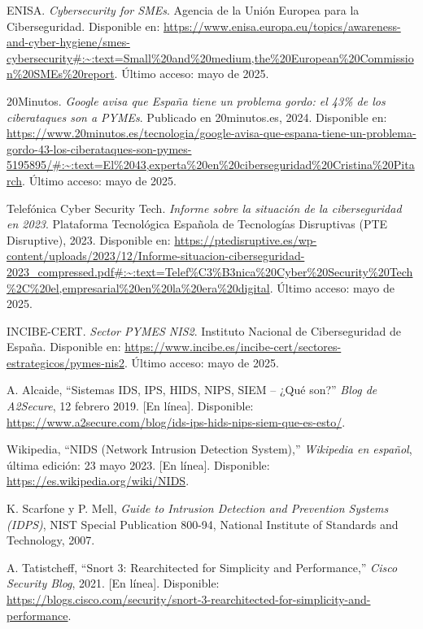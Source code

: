 \documentclass[11pt,a4paper,twoside]{report}
\begin{document}
\begin{thebibliography}{99}
	
	ENISA. \textit{Cybersecurity for SMEs}. Agencia de la Unión Europea para la Ciberseguridad. Disponible en: \url{https://www.enisa.europa.eu/topics/awareness-and-cyber-hygiene/smes-cybersecurity#:~:text=Small\%20and\%20medium,the\%20European\%20Commission\%20SMEs\%20report}. Último acceso: mayo de 2025.
	
	20Minutos. \textit{Google avisa que España tiene un problema gordo: el 43\% de los ciberataques son a PYMEs}. Publicado en 20minutos.es, 2024. Disponible en: \url{https://www.20minutos.es/tecnologia/google-avisa-que-espana-tiene-un-problema-gordo-43-los-ciberataques-son-pymes-5195895/#:~:text=El\%2043,experta\%20en\%20ciberseguridad\%20Cristina\%20Pitarch}. Último acceso: mayo de 2025.
	
	Telefónica Cyber Security Tech. \textit{Informe sobre la situación de la ciberseguridad en 2023}. Plataforma Tecnológica Española de Tecnologías Disruptivas (PTE Disruptive), 2023. Disponible en: \url{https://ptedisruptive.es/wp-content/uploads/2023/12/Informe-situacion-ciberseguridad-2023_compressed.pdf#:~:text=Telef\%C3\%B3nica\%20Cyber\%20Security\%20Tech\%2C\%20el,empresarial\%20en\%20la\%20era\%20digital}. Último acceso: mayo de 2025.
	
	INCIBE-CERT. \textit{Sector PYMES NIS2}. Instituto Nacional de Ciberseguridad de España. Disponible en: \url{https://www.incibe.es/incibe-cert/sectores-estrategicos/pymes-nis2}. Último acceso: mayo de 2025.
	
	 A. Alcaide, “Sistemas IDS, IPS, HIDS, NIPS, SIEM – ¿Qué son?” \textit{Blog de A2Secure}, 12 febrero 2019. [En línea]. Disponible: \url{https://www.a2secure.com/blog/ids-ips-hids-nips-siem-que-es-esto/}.
	
	 Wikipedia, “NIDS (Network Intrusion Detection System),” \textit{Wikipedia en español}, última edición: 23 mayo 2023. [En línea]. Disponible: \url{https://es.wikipedia.org/wiki/NIDS}.
	
	 K. Scarfone y P. Mell, \textit{Guide to Intrusion Detection and Prevention Systems (IDPS)}, NIST Special Publication 800-94, National Institute of Standards and Technology, 2007.
	
	 A. Tatistcheff, “Snort 3: Rearchitected for Simplicity and Performance,” \textit{Cisco Security Blog}, 2021. [En línea]. Disponible: \url{https://blogs.cisco.com/security/snort-3-rearchitected-for-simplicity-and-performance}.
	

\end{thebibliography}
\end{document}
